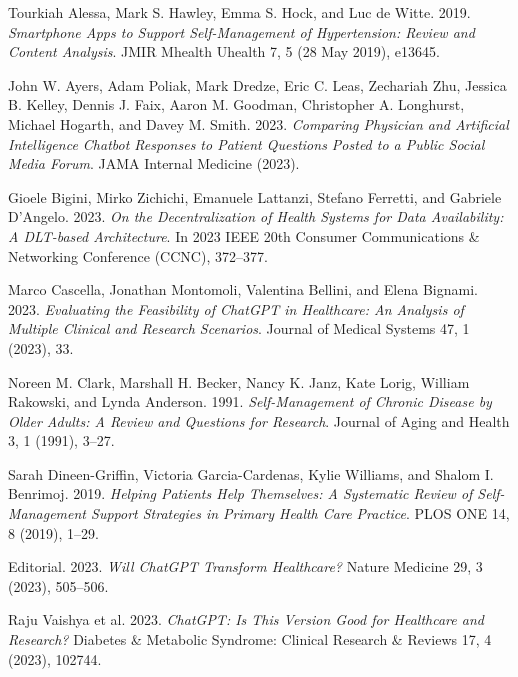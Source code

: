 
\label{Bibliography}

\begin{thebibliography}{55}

Tourkiah Alessa, Mark S. Hawley, Emma S. Hock, and Luc de Witte. 2019. \emph{Smartphone Apps to Support Self-Management of Hypertension: Review and Content Analysis}. JMIR Mhealth Uhealth 7, 5 (28 May 2019), e13645.

John W. Ayers, Adam Poliak, Mark Dredze, Eric C. Leas, Zechariah Zhu, Jessica B. Kelley, Dennis J. Faix, Aaron M. Goodman, Christopher A. Longhurst, Michael Hogarth, and Davey M. Smith. 2023. \emph{Comparing Physician and Artificial Intelligence Chatbot Responses to Patient Questions Posted to a Public Social Media Forum}. JAMA Internal Medicine (2023).

Gioele Bigini, Mirko Zichichi, Emanuele Lattanzi, Stefano Ferretti, and Gabriele D’Angelo. 2023. \emph{On the Decentralization of Health Systems for Data Availability: A DLT-based Architecture}. In 2023 IEEE 20th Consumer Communications \& Networking Conference (CCNC), 372--377.

Marco Cascella, Jonathan Montomoli, Valentina Bellini, and Elena Bignami. 2023. \emph{Evaluating the Feasibility of ChatGPT in Healthcare: An Analysis of Multiple Clinical and Research Scenarios}. Journal of Medical Systems 47, 1 (2023), 33.

Noreen M. Clark, Marshall H. Becker, Nancy K. Janz, Kate Lorig, William Rakowski, and Lynda Anderson. 1991. \emph{Self-Management of Chronic Disease by Older Adults: A Review and Questions for Research}. Journal of Aging and Health 3, 1 (1991), 3--27.

Sarah Dineen-Griffin, Victoria Garcia-Cardenas, Kylie Williams, and Shalom I. Benrimoj. 2019. \emph{Helping Patients Help Themselves: A Systematic Review of Self-Management Support Strategies in Primary Health Care Practice}. PLOS ONE 14, 8 (2019), 1--29.

Editorial. 2023. \emph{Will ChatGPT Transform Healthcare?} Nature Medicine 29, 3 (2023), 505--506.

Raju Vaishya et al. 2023. \emph{ChatGPT: Is This Version Good for Healthcare and Research?} Diabetes \& Metabolic Syndrome: Clinical Research \& Reviews 17, 4 (2023), 102744.


\end{thebibliography}
